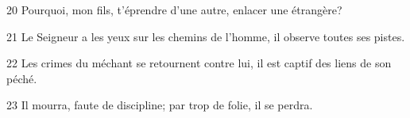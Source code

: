
20 Pourquoi, mon fils, t’éprendre d’une autre, enlacer une étrangère?

21 Le Seigneur a les yeux sur les chemins de l’homme, il observe toutes ses pistes.

22 Les crimes du méchant se retournent contre lui, il est captif des liens de son péché.

23 Il mourra, faute de discipline; par trop de folie, il se perdra.